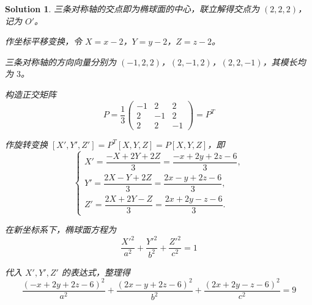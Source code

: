 \documentclass[a4paper,12pt]{article}
\newtheorem*{sol}{Solution}
\begin{document}
\begin{sol}
    三条对称轴的交点即为椭球面的中心，联立解得交点为 $(2, 2, 2)$，记为 $O'$。

    作坐标平移变换，令 $X = x - 2$，$Y = y - 2$，$Z = z - 2$。

    三条对称轴的方向向量分别为 $(-1, 2, 2)$，$(2, -1, 2)$，$(2, 2, -1)$，其模长均为 $3$。

    构造正交矩阵
    $$P = \frac{1}{3}\begin{pmatrix}
            -1 & 2  & 2  \\
            2  & -1 & 2  \\
            2  & 2  & -1
        \end{pmatrix} = P^T$$

    作旋转变换 $[X', Y', Z'] = P^T[X, Y, Z] = P[X, Y, Z]$，即
    $$\begin{cases}
            X' = \dfrac{-X + 2Y + 2Z}{3} = \dfrac{-x + 2y + 2z - 6}{3}, \\[1em]
            Y' = \dfrac{2X - Y + 2Z}{3} = \dfrac{2x - y + 2z - 6}{3},   \\[1em]
            Z' = \dfrac{2X + 2Y - Z}{3} = \dfrac{2x + 2y - z - 6}{3}.
        \end{cases}$$

    在新坐标系下，椭球面方程为
    $$\frac{X'^2}{a^2} + \frac{Y'^2}{b^2} + \frac{Z'^2}{c^2} = 1$$

    代入 $X', Y', Z'$ 的表达式，整理得
    $$\frac{(-x + 2y + 2z - 6)^2}{a^2} + \frac{(2x - y + 2z - 6)^2}{b^2} + \frac{(2x + 2y - z - 6)^2}{c^2} = 9$$
\end{sol}
\end{document}
